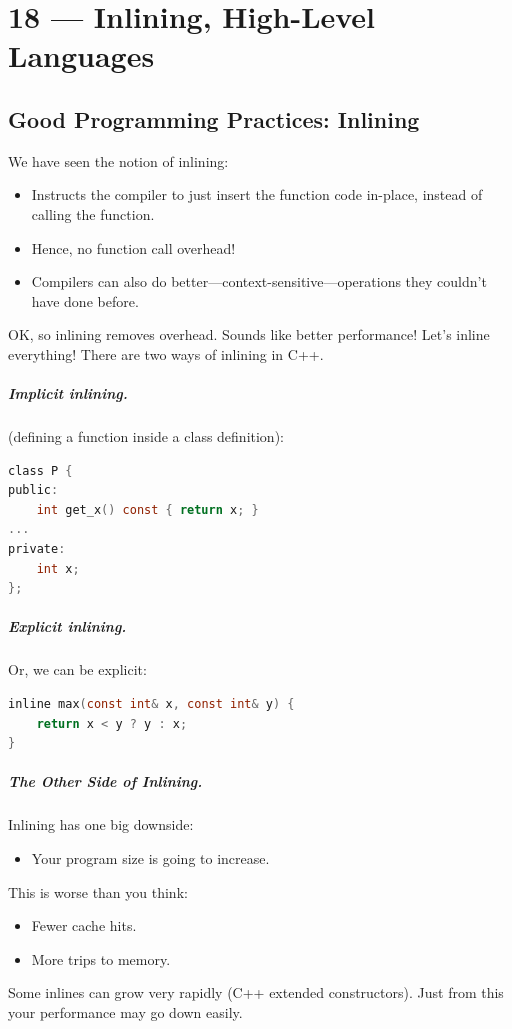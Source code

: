 \documentclass[a4paper]{report}
\begin{document}
\chapter*{18 --- Inlining, High-Level Languages}


\section*{Good Programming Practices: Inlining}
We have seen the notion of inlining:
  \begin{itemize}
    \item Instructs the compiler to just insert the function code in-place,
      instead of calling the function.
    \item Hence, no function call overhead!
    \item Compilers can also do better---context-sensitive---operations they couldn't
      have done before.
  \end{itemize}

OK, so inlining removes overhead. Sounds like better performance! Let's inline everything!
There are two ways of inlining in C++.

\paragraph{Implicit inlining.} (defining a function inside a class definition):
  \begin{lstlisting}[language=C]
class P {
public:
    int get_x() const { return x; }
...
private:
    int x;
};
  \end{lstlisting}

\paragraph{Explicit inlining.} Or, we can be explicit:
  \begin{lstlisting}[language=C]
inline max(const int& x, const int& y) {
    return x < y ? y : x;
}
  \end{lstlisting}

\paragraph{The Other Side of Inlining.}
Inlining has one big downside:
  \begin{itemize}
    \item Your program size is going to increase.
  \end{itemize}
   This is worse than you think:
      \begin{itemize}
        \item Fewer cache hits.
        \item More trips to memory.
      \end{itemize}
   Some inlines can grow very rapidly (C++ extended constructors).
  Just from this your performance may go down easily.
\end{document}
